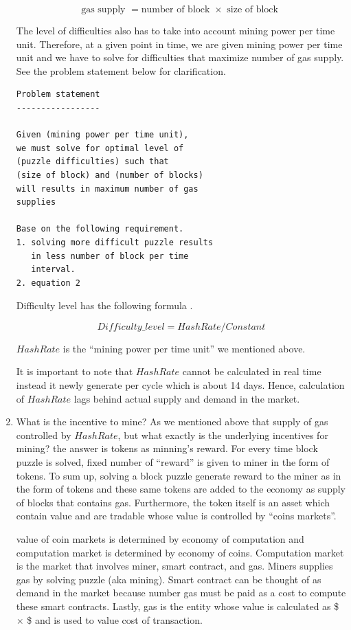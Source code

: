 \documentclass{IEEEtran}
\begin{document}
\begin{enumerate}
\begin{equation}
\label{gas_supply_eq}
\text{gas supply }= \text{number of block } \times \text{ size of block }
\end{equation}

The level of difficulties also has to take into account mining power per time unit. Therefore, at a given point in time, we are given mining power per time unit and we have to solve for difficulties that maximize number of gas supply. See the problem statement below for clarification.

\begin{verbatim}
Problem statement
-----------------

Given (mining power per time unit),
we must solve for optimal level of
(puzzle difficulties) such that
(size of block) and (number of blocks)
will results in maximum number of gas
supplies

Base on the following requirement.
1. solving more difficult puzzle results
   in less number of block per time
   interval.
2. equation 2
\end{verbatim}

Difficulty level has the following formula \cite{wood2014ethereum}.

\begin{equation}
Difficulty\_level = HashRate / Constant
\end{equation}

\(HashRate\) is the ``mining power per time unit'' we mentioned above.

It is important to note that \(HashRate\) cannot be calculated in real time instead it newly generate per cycle which is about 14 days. Hence, calculation of \(HashRate\) lags behind actual supply and demand in the market.

\item What is the incentive to mine?
\label{sec:org19ddf61}
As we mentioned above that supply of gas controlled by \(HashRate\), but what exactly is the underlying incentives for mining? the answer is tokens as minning's reward. For every time block puzzle is solved, fixed number of ``reward'' is given to miner in the form of tokens. To sum up, solving a block puzzle generate reward to the miner as in the form of tokens and these same tokens are added to the economy as supply of blocks that contains gas. Furthermore, the token itself is an asset which contain value and are tradable whose value is controlled by ``coins markets''.

value of coin markets is determined by economy of computation and computation market is determined by economy of coins. Computation market is the market that involves miner, smart contract, and gas. Miners supplies gas by solving puzzle (aka mining). Smart contract can be thought of as demand in the market because number gas must be paid as a cost to compute these smart contracts. Lastly, gas is the entity whose value is calculated as \$  \(\times\) \$ and is used to value cost of transaction.


\end{enumerate}
\end{document}
